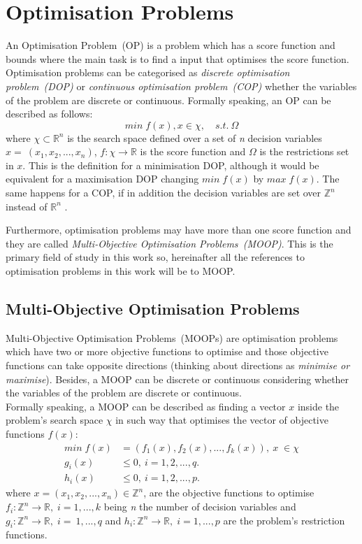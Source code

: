 \section{Optimisation Problems}
An Optimisation Problem~(OP) is a problem which has a score function and bounds where the main task is to find a input that optimises the score function. Optimisation problems can be categorised as \textit{discrete optimisation problem~(DOP)} or \textit{continuous optimisation problem~(COP)} whether the variables of the problem are discrete or continuous. 
Formally speaking, an OP can be described as follows:
\begin{equation*}
min\;f(x), x \in \chi,\quad s.t.\:\Omega
\end{equation*}
where $\chi \subset\mathbb{R}^{n}$ is the search space defined over a set of \textit{n} decision variables  $x = ~(x_{1}, x_{2},..., x_{n})$, $f: \chi \rightarrow \mathbb{R}$ is the score function and $\Omega$ is the restrictions set in $x$. This is the definition for a minimisation DOP, although it would be equivalent for a maximisation DOP changing $min\;f(x)$ by $max\;f(x)$. The same happens for a COP, if in addition the decision variables are set over $\mathbb{Z}^{n}$ instead of $\mathbb{R}^{n}$ .

Furthermore, optimisation problems may have more than one score function and they are called \textit{Multi-Objective Optimisation Problems~(MOOP)}. This is the primary field of study in this work so, hereinafter all the references to optimisation problems in this work will be to MOOP.
\subsection{Multi-Objective Optimisation Problems}

Multi-Objective Optimisation Problems~(MOOPs) are optimisation problems which have two or more objective functions to optimise and those objective functions can take opposite directions (thinking about directions as \textit{minimise or maximise}). Besides, a MOOP can be discrete or continuous considering whether the variables of the problem are discrete or continuous. \\
Formally speaking, a MOOP can be described as finding a vector \textbf{$x$} inside the problem's search space \textit{$\chi$} in such way that optimises the vector of objective functions \textit{$f(x)$}\cite{search}:
\begin{align*}
min\;f(x) & = (f_{1}(x), f_{2}(x), ..., f_{k}(x)), \: x\;\in\chi \\
 g_{i}(x) & \leq 0, \: i = 1, 2, ..., q. \\
 h_{i}(x) & \leq 0, \: i = 1, 2, ..., p.
\end{align*}
where $x = (x_{1}, x_{2}, ..., x_{n}) \in \mathbb{Z}^{n}$, are the objective functions to optimise $f_{i}: \mathbb{Z}^{n} \rightarrow \mathbb{R}, \; i = 1, ..., k$ being \textit{n} the number of decision variables and $g_{i}: \mathbb{Z}^{n} \rightarrow \mathbb{R}, \; i = ~1, ..., q$ and $h_{i}: \mathbb{Z}^{n} \rightarrow \mathbb{R}, \; i = 1, ..., p$ are the problem's restriction functions.

